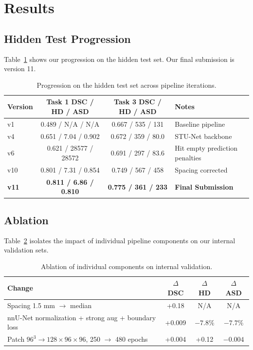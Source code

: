 \documentclass[runningheads]{llncs}
\begin{document}
\section{Results}

\subsection{Hidden Test Progression}

Table~\ref{tab:progression} shows our progression on the hidden test set. Our final submission is version 11.

\begin{table}[ht]
\caption{Progression on the hidden test set across pipeline iterations.}\label{tab:progression}
\centering\small
\begin{tabular}{lccl}
\toprule
Version & Task 1 DSC / HD / ASD & Task 3 DSC / HD / ASD & Notes \\
\midrule
v1 & 0.489 / N/A / N/A & 0.667 / 535 / 131 & Baseline pipeline \\
v4 & 0.651 / 7.04 / 0.902 & 0.672 / 359 / 80.0 & STU-Net backbone \\
v6 & 0.621 / 28577 / 28572 & 0.691 / 297 / 83.6 & Hit empty prediction penalties \\
v10 & 0.801 / 7.31 / 0.854 & 0.749 / 567 / 458 & Spacing corrected \\
\textbf{v11} & \textbf{0.811 / 6.86 / 0.810} & \textbf{0.775 / 361 / 233} & \textbf{Final Submission} \\
\bottomrule
\end{tabular}
\end{table}

\subsection{Ablation}

Table~\ref{tab:ablation} isolates the impact of individual pipeline components on our internal validation sets.

\begin{table}[ht]
\caption{Ablation of individual components on internal validation.}\label{tab:ablation}
\centering\small
\begin{tabular}{lccc}
\toprule
Change & $\Delta$ DSC & $\Delta$ HD & $\Delta$ ASD \\
\midrule
Spacing 1.5 mm $\rightarrow$ median & +0.18 & N/A & N/A \\
nnU-Net normalization + strong aug + boundary loss & +0.009 & $-7.8\%$ & $-7.7\%$ \\
Patch $96^3 \rightarrow 128 \times 96 \times 96$, 250 $\rightarrow$ 480 epochs & +0.004 & +0.12 & $-0.004$ \\
\bottomrule
\end{tabular}
\end{table}
\end{document}
